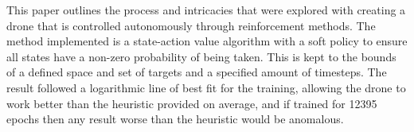 This paper outlines the process and intricacies that were explored with creating a drone that is controlled autonomously through reinforcement methods. The method implemented is a state-action value algorithm with a soft policy to ensure all states have a non-zero probability of being taken. This is kept to the bounds of a defined space and set of targets and a specified amount of timesteps. The result followed a logarithmic line of best fit for the training, allowing the drone to work better than the heuristic provided on average, and if trained for 12395 epochs then any result worse than the heuristic would be anomalous. 